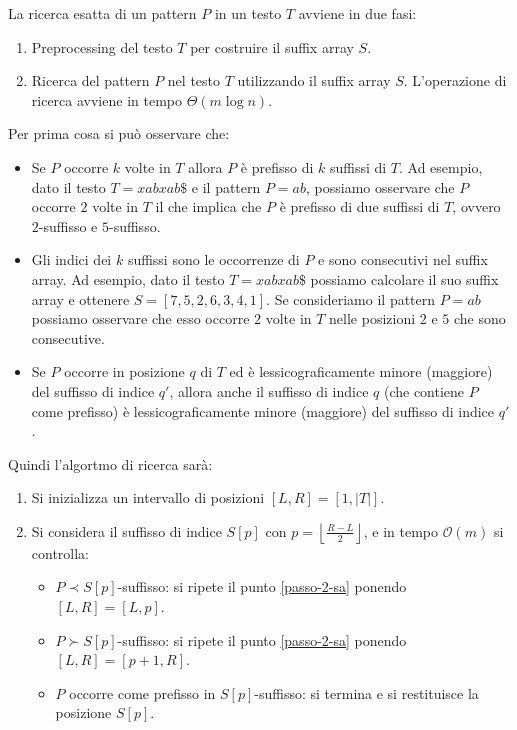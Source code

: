 La ricerca esatta di un pattern $P$ in un testo $T$ avviene in due fasi:
\begin{enumerate}
    \item Preprocessing del testo $T$ per costruire il suffix array $S$.
    \item Ricerca del pattern $P$ nel testo $T$ utilizzando il suffix array $S$.
          L'operazione di ricerca avviene in tempo $\Theta(m \log n)$.
\end{enumerate}
Per prima cosa si può osservare che:
\begin{itemize}
    \item Se $P$ occorre $k$ volte in $T$ allora $P$ è prefisso di $k$ suffissi
          di $T$. Ad esempio, dato il testo $T = xabxab\$$ e il pattern $P = ab$,
          possiamo osservare che $P$ occorre $2$ volte in $T$ il che implica che
          $P$ è prefisso di due suffissi di $T$, ovvero $2$-suffisso e
          $5$-suffisso.
    \item Gli indici dei $k$ suffissi sono le occorrenze di $P$ e sono consecutivi
          nel suffix array. Ad esempio, dato il testo $T = xabxab\$$ possiamo
          calcolare il suo suffix array e ottenere $S=[7, 5, 2, 6, 3, 4, 1]$. Se
          consideriamo il pattern $P = ab$ possiamo osservare che  esso occorre
          $2$ volte in $T$ nelle posizioni $2$ e $5$ che sono consecutive.
    \item Se $P$ occorre in posizione $q$ di $T$ ed è lessicograficamente minore
          (maggiore) del suffisso di indice $q'$, allora anche il suffisso di
          indice $q$ (che contiene $P$ come prefisso) è lessicograficamente
          minore (maggiore) del suffisso di indice $q'$.
\end{itemize}
Quindi l'algortmo di ricerca sarà:
\begin{enumerate}
    \item Si inizializza un intervallo di posizioni $[L,R] = [1, |T|]$.
    \item \label{passo-2-sa} Si considera il suffisso di indice $S[p]$ con
          $p = \left\lfloor \frac{R - L}{2} \right\rfloor$, e in tempo
          $\mathcal{O}(m)$ si controlla:
          \begin{itemize}
              \item $P \prec S[p]$-suffisso: si ripete il punto \ref{passo-2-sa}
                    ponendo $[L, R] = [L, p]$.
              \item $P \succ S[p]$-suffisso: si ripete il punto \ref{passo-2-sa}
                    ponendo $[L, R] = [p + 1, R]$.
              \item $P$ occorre come prefisso in $S[p]$-suffisso: si termina e
                    si restituisce la posizione $S[p]$.
          \end{itemize}
\end{enumerate}
